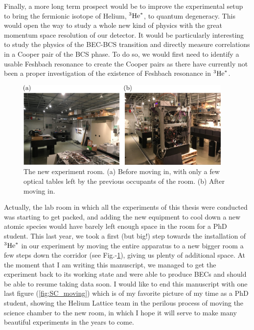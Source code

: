 Finally, a more long term prospect would be to improve the experimental setup to bring the fermionic isotope of Helium, $^3\mathrm{He}^*$, to quantum degeneracy. This would open the way to study a whole new kind of physics with the great momentum space resolution of our detector. It would be particularly interesting to study the physics of the BEC-BCS transition and directly measure \kmk correlations in a Cooper pair of the BCS phase. To do so, we would first need to identify a usable Feshbach resonance to create the Cooper pairs as there have currently not been a proper investigation of the existence of Feshbach resonance in $^3\mathrm{He}^*$. 

\renewcommand{\thefigure}{1}
\begin{figure}[h!]
    \centering
    \includegraphics[width=0.95\textwidth]{Fig/Conclusion/before_after.png}
    \caption[The new experiment room]{The new experiment room. (a) Before moving in, with only a few optical tables left by the previous occupants of the room. (b) After moving in.}
    \label{fig:before_after}
\end{figure}

Actually, the lab room in which all the experiments of this thesis were conducted was starting to get packed, and adding the new equipment to cool down a new atomic species would have barely left enough space in the room for a PhD student. This last year, we took a first (but big!) step towards the installation of $^3\mathrm{He}^*$ in our experiment by moving the entire apparatus to a new bigger room a few steps down the corridor (see Fig.-\ref{fig:before_after}), giving us plenty of additional space. At the moment that I am writing this manuscript, we managed to get the experiment back to its working state and were able to produce BECs and should be able to resume taking data soon. I would like to end this manuscript with one last figure (\ref{fig:SC_moving}) which is of my favorite picture of my time as a PhD student, showing the Helium Lattice team in the perilous process of moving the science chamber to the new room, in which I hope it will serve to make many beautiful experiments in the years to come.




